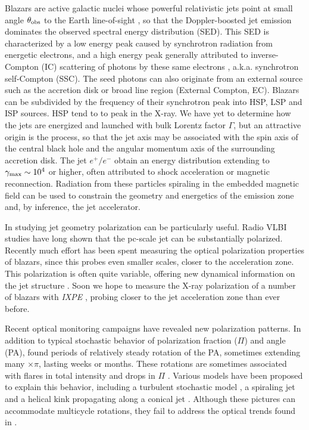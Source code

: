 Blazars are active galactic nuclei whose powerful relativistic jets point at small angle $\theta_{\rm obs}$  to the Earth line-of-sight \citep{urry_unified_1995}, so that the Doppler-boosted jet emission dominates the observed spectral energy distribution (SED). This SED is characterized by a low energy peak caused by synchrotron radiation from energetic electrons, and a high energy peak generally attributed to inverse-Compton (IC) scattering of photons by these same electrons \citep{maraschi_jet_1992}, a.k.a. synchrotron self-Compton (SSC). The seed photons can also originate from an external source such as the accretion disk or broad line region (External Compton, EC). Blazars can be subdivided by the frequency of their synchrotron peak \citep{abdo_spectral_2010} into HSP, LSP and ISP sources. HSP tend to to peak in the X-ray.
We have yet to determine how the jets are energized and launched with bulk Lorentz factor $\Gamma$, but an attractive origin is the \citet{blandford_electromagnetic_1977} process, so that the jet axis may be associated with the spin axis of the central black hole and the angular momentum axis of the surrounding accretion disk. The jet $e^+/e^-$ obtain an energy distribution extending to $\gamma_{\rm max} \sim 10^4$ or higher, often attributed to shock acceleration or magnetic reconnection. Radiation from these particles spiraling in the embedded magnetic field can be used to constrain the geometry and energetics of the emission zone and, by inference, the jet accelerator.

In studying jet geometry polarization can be particularly useful. Radio VLBI studies have long shown that the pc-scale jet can be substantially polarized. Recently much effort has been spent measuring the optical polarization properties of blazars, since this probes even smaller scales, closer to the acceleration zone. This polarization is often quite variable, offering new dynamical information on the jet structure \citep[e.g.][]{blinov_robopol:_2015, lynch_green_2018}.
Soon we hope to measure the X-ray polarization of a number of blazars with \textit{IXPE} \citep{weisskopf_imaging_2016}, probing closer to the jet acceleration zone than ever before.

Recent optical monitoring campaigns have revealed new polarization patterns. In addition to typical stochastic behavior of polarization fraction ($\Pi$) and angle (PA), \citet{blinov_robopol:_2015} found periods of relatively steady rotation of the PA, sometimes extending many $\times \pi$, lasting weeks or months. These rotations are sometimes associated with flares in total intensity and drops in $\Pi$ \citep{blinov_robopol:_2016}. Various models have been proposed to explain this behavior, including a turbulent stochastic model \citep{marscher_turbulent_2014}, a spiraling jet \citep{lyutikov_polarization_2017} and a helical kink propagating along a conical jet \citep{nalewajko_model_2017}. Although these pictures can accommodate multicycle rotations, they fail to address the optical trends found in \citet{blinov_robopol:_2016}.

